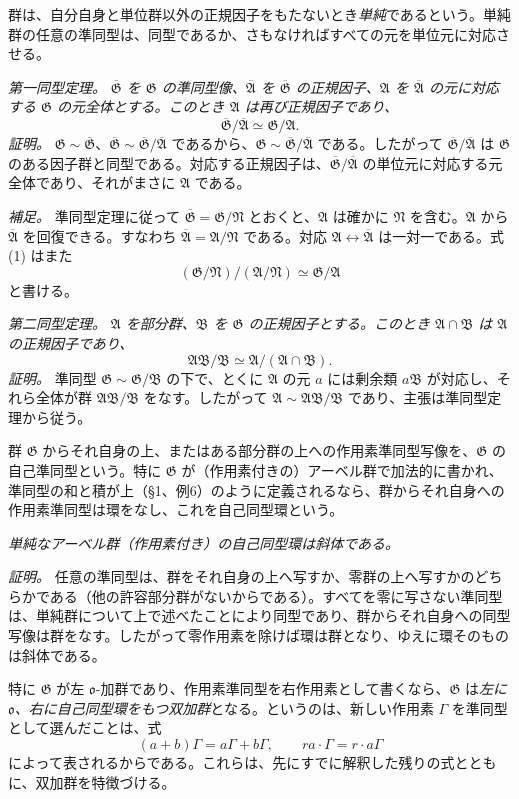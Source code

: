 \documentclass[11pt]{article}
\providecommand{\mG}{\mathfrak{G}}
\providecommand{\mA}{\mathfrak{A}}
\providecommand{\mB}{\mathfrak{B}}
\providecommand{\mN}{\mathfrak{N}}
\providecommand{\mo}{\mathfrak{o}}
\begin{document}
群は、自分自身と単位群以外の正規因子をもたないとき\emph{単純}であるという。単純群の任意の準同型は、同型であるか、さもなければすべての元を単位元に対応させる。

\emph{第一同型定理。} \emph{$\overline{\mG}$ を $\mG$ の準同型像、$\overline{\mA}$ を $\overline{\mG}$ の正規因子、$\mA$ を $\overline{\mA}$ の元に対応する $\mG$ の元全体とする。このとき $\mA$ は再び正規因子であり、}
\[
        \overline{\mG}/\overline{\mA}\simeq \mG/\mA. \tag{1}
\]
\emph{証明。} $\mG\sim\overline{\mG}$、$\overline{\mG}\sim\overline{\mG}/\overline{\mA}$ であるから、$\mG\sim\overline{\mG}/\overline{\mA}$ である。したがって $\overline{\mG}/\overline{\mA}$ は $\mG$ のある因子群と同型である。対応する正規因子は、$\overline{\mG}/\overline{\mA}$ の単位元に対応する元全体であり、それがまさに $\mA$ である。

\emph{補足。} 準同型定理に従って $\overline{\mG}=\mG/\mN$ とおくと、$\mA$ は確かに $\mN$ を含む。$\mA$ から $\overline{\mA}$ を回復できる。すなわち $\overline{\mA}=\mA/\mN$ である。対応 $\mA\leftrightarrow\overline{\mA}$ は一対一である。式 (1) はまた
\[
        (\mG/\mN)/(\mA/\mN)\simeq \mG/\mA
\]
と書ける。

\emph{第二同型定理。} \emph{$\mA$ を部分群、$\mB$ を $\mG$ の正規因子とする。このとき $\mA\cap\mB$ は $\mA$ の正規因子であり、}
\[
        \mA\mB/\mB\simeq \mA/(\mA\cap\mB).
\]
\emph{証明。} 準同型 $\mG\sim\mG/\mB$ の下で、とくに $\mA$ の元 $a$ には剰余類 $a\mB$ が対応し、それら全体が群 $\mA\mB/\mB$ をなす。したがって $\mA\sim\mA\mB/\mB$ であり、主張は準同型定理から従う。

群 $\mG$ からそれ自身の上、またはある部分群の上への作用素準同型写像を、$\mG$ の自己準同型という。特に $\mG$ が（作用素付きの）アーベル群で加法的に書かれ、準同型の和と積が上（§1、例6）のように定義されるなら、群からそれ自身への作用素準同型は環をなし、これを自己同型環という。

\emph{単純なアーベル群（作用素付き）の自己同型環は斜体である。}

\emph{証明。} 任意の準同型は、群をそれ自身の上へ写すか、零群の上へ写すかのどちらかである（他の許容部分群がないからである）。すべてを零に写さない準同型は、単純群について上で述べたことにより同型であり、群からそれ自身への同型写像は群をなす。したがって零作用素を除けば環は群となり、ゆえに環そのものは斜体である。

特に $\mG$ が左 $\mo$-加群であり、作用素準同型を右作用素として書くなら、$\mG$ は\emph{左に $\mo$、右に自己同型環をもつ双加群}となる。というのは、新しい作用素 $\Gamma$ を準同型として選んだことは、式
\[
        (a+b)\Gamma=a\Gamma+b\Gamma,
        \qquad ra\cdot\Gamma=r\cdot a\Gamma
\]
によって表されるからである。これらは、先にすでに解釈した残りの式とともに、双加群を特徴づける。
\end{document}
